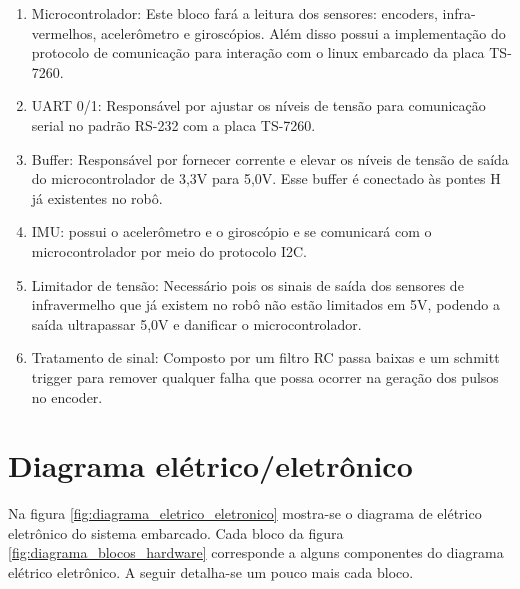 \begin{enumerate}[topsep=0pt, partopsep=0pt, itemsep=0pt]
    \item Microcontrolador: Este bloco fará a leitura dos sensores: encoders, infra-vermelhos, acelerômetro e giroscópios. Além disso possui a implementação do protocolo de comunicação para interação com o linux embarcado da placa TS-7260.
    \item UART 0/1: Responsável por ajustar os níveis de tensão para comunicação serial no padrão RS-232 com a placa TS-7260.
    \item Buffer: Responsável por fornecer corrente e elevar os níveis de tensão de saída do microcontrolador de 3,3V para 5,0V. Esse buffer é conectado às pontes H já existentes no robô.
    \item IMU: possui o acelerômetro e o giroscópio e se comunicará com o microcontrolador por meio do protocolo I2C.
    \item Limitador de tensão: Necessário pois os sinais de saída dos sensores de infravermelho que já existem no robô não estão limitados em 5V, podendo a saída ultrapassar 5,0V e danificar o microcontrolador. 
    \item Tratamento de sinal: Composto por um filtro RC passa baixas e um schmitt trigger para remover qualquer falha que possa ocorrer na geração dos pulsos no encoder.
\end{enumerate}

\section{Diagrama elétrico/eletrônico}

Na figura \ref{fig:diagrama_eletrico_eletronico} mostra-se o diagrama de elétrico eletrônico do sistema embarcado. Cada bloco da figura \ref{fig:diagrama_blocos_hardware} corresponde a alguns componentes do diagrama elétrico eletrônico. A seguir detalha-se um pouco mais cada bloco.

